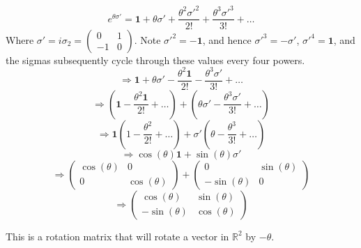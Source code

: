 \documentclass[12pt]{article}
\begin{document}
$$e^{\theta \sigma'} = \textbf{1} + \theta \sigma' + \frac{\theta^2 \sigma'^2}{2!} + \frac{\theta^3 \sigma'^3}{3!} + \dots$$
Where $\sigma' = i \sigma_2 = \begin{pmatrix} 0 & 1\\ -1 & 0 \end{pmatrix}$. Note $\sigma'^2 = -\textbf{1}$, and hence $\sigma'^3 = -\sigma'$, $\sigma'^4 = \textbf{1}$, and the sigmas subsequently cycle through these values every four powers.
$$\Rightarrow \textbf{1} + \theta \sigma' - \frac{\theta^2 \textbf{1}}{2!} - \frac{\theta^3 \sigma'}{3!} + \dots$$
$$\Rightarrow (\textbf{1} - \frac{\theta^2 \textbf{1}}{2!} + \dots) + (\theta \sigma' - \frac{\theta^3 \sigma'}{3!} + \dots)$$
$$\Rightarrow \textbf{1}(1 - \frac{\theta^2}{2!} + \dots) + \sigma'(\theta - \frac{\theta^3}{3!} + \dots)$$
$$\Rightarrow \cos(\theta) \textbf{1} + \sin(\theta) \sigma'$$
$$\Rightarrow \begin{pmatrix} \cos(\theta) & 0 \\ 0 & \cos(\theta) \end{pmatrix} + \begin{pmatrix} 0 & \sin(\theta) \\ -\sin(\theta) & 0 \end{pmatrix}$$
$$\Rightarrow \begin{pmatrix} \cos(\theta) & \sin(\theta) \\ -\sin(\theta) & \cos(\theta) \end{pmatrix}$$

This is a rotation matrix that will rotate a vector in $\mathbb{R}^2$ by $-\theta$.
\end{document}
